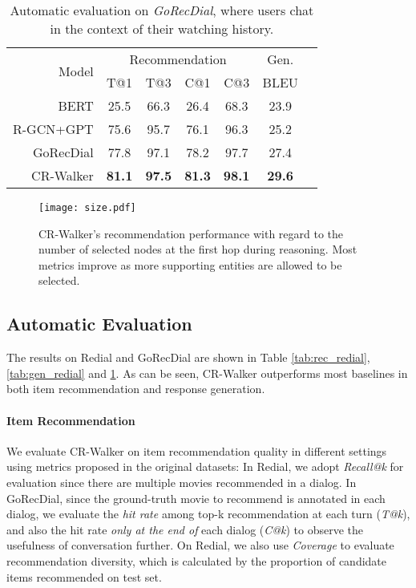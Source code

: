 \documentclass[11pt]{article}
\begin{document}
\begin{table}[!th]
    \centering
    \small
    \begin{tabular}{rcccccc}
    \toprule
         \multirow{2}{*}[-0.04in]{Model} & \multicolumn{4}{c}{Recommendation} & Gen. \\
    \cmidrule(lr){2-5} \cmidrule(lr){6-6}
         & T@1 & T@3 & C@1 & C@3 & BLEU \\\midrule
        BERT & 25.5 & 66.3 & 26.4 & 68.3 & 23.9 \\R-GCN+GPT & 75.6 & 95.7 & 76.1 & 96.3 & 25.2\\
        GoRecDial & 77.8 & 97.1 & 78.2 & 97.7 & 27.4\\\midrule
        CR-Walker & \textbf{81.1} & \textbf{97.5} & \textbf{81.3} & \textbf{98.1} & \textbf{29.6}\\
    \bottomrule
    \end{tabular}
    \caption{Automatic evaluation on \textit{GoRecDial}, where users chat in the context of their watching history.}
    \label{tab:auto_gorecdial}
\end{table}


\begin{figure*}[tb]
    \centering
    \texttt{[image: size.pdf]}
    \caption{CR-Walker's recommendation performance with regard to the number of selected nodes at the first hop during reasoning. Most metrics improve as more supporting entities are allowed to be selected.}\label{fig:size}
\end{figure*}

\subsection{Automatic Evaluation}


The results on Redial and GoRecDial are shown in Table \ref{tab:rec_redial}, \ref{tab:gen_redial} and \ref{tab:auto_gorecdial}. As can be seen,  CR-Walker outperforms most baselines in both item recommendation and response generation. 


\paragraph{Item Recommendation} 
We evaluate CR-Walker on item recommendation quality in different settings using metrics proposed in the original datasets: In Redial, we adopt \textit{Recall@k} for evaluation since there are multiple movies recommended in a dialog. In GoRecDial, since the ground-truth movie to recommend is annotated in each dialog, we evaluate the \textit{hit rate} among top-k recommendation at each turn (\textit{T@k}), and also the hit rate \textit{only at the end of} each dialog (\textit{C@k}) to observe the usefulness of conversation further. On Redial, we also use \textit{Coverage} to evaluate recommendation diversity, which is calculated by the proportion of candidate items recommended on test set.
\end{document}
